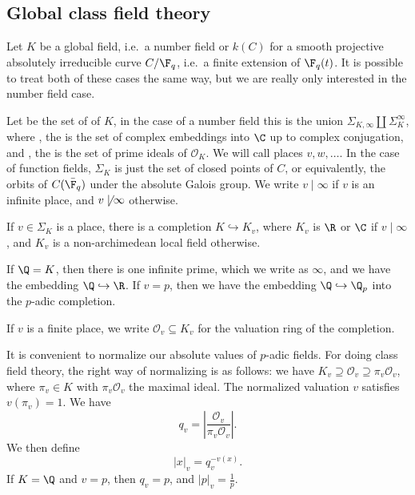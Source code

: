 \documentclass[a4paper]{article}
\begin{document}
\subsection{Global class field theory}
Let $K$ be a global field, i.e.\ a number field or $k(C)$ for a smooth projective absolutely irreducible curve $C/\F_q$, i.e.\ a finite extension of $\F_q(t)$. It is possible to treat both of these cases the same way, but we are really only interested in the number field case.

Let  be the set of  of $K$, in the case of a number field this is the union $\Sigma_{K, \infty} \coprod \Sigma_K^\infty$, where , the  is the set of complex embeddings into $\C$ up to complex conjugation, and , the  is the set of prime ideals of $\mathcal{O}_K$. We will call places $v, w, \ldots$. In the case of function fields, $\Sigma_K$ is just the set of closed points of $C$, or equivalently, the orbits of $C(\bar{\F_q})$ under the absolute Galois group. We write $v \mid \infty$ if $v$ is an infinite place, and $v \not \mid \infty$ otherwise.

If $v \in \Sigma_K$ is a place, there is a completion $K \hookrightarrow K_v$, where $K_v$ is $\R$ or $\C$ if $v \mid \infty$, and $K_v$ is a non-archimedean local field otherwise.

\begin{eg}
  If $\Q = K$, then there is one infinite prime, which we write as $\infty$, and we have the embedding $\Q \hookrightarrow \R$. If $v = p$, then we have the embedding $\Q \hookrightarrow \Q_p$ into the $p$-adic completion.
\end{eg}

\begin{notation}
  If $v$ is a finite place, we write $\mathcal{O}_v \subseteq K_v$ for the valuation ring of the completion.
\end{notation}

It is convenient to normalize our absolute values of $p$-adic fields. For doing class field theory, the right way of normalizing is as follows: we have $K_v \supseteq \mathcal{O}_v \supseteq \pi_v \mathcal{O}_v$, where $\pi_v \in K$ with $\pi_v \mathcal{O}_v$ the maximal ideal. The normalized valuation $v$ satisfies $v(\pi_v) = 1$. We have
\[
  q_v = \left|\frac{\mathcal{O}_v}{\pi_v \mathcal{O}_v}\right|.
\]
We then define
\[
  |x|_v = q_v^{-v(x)}.
\]
If $K = \Q$ and $v = p$, then $q_v = p$, and $|p|_v = \frac{1}{p}$.
\end{document}

